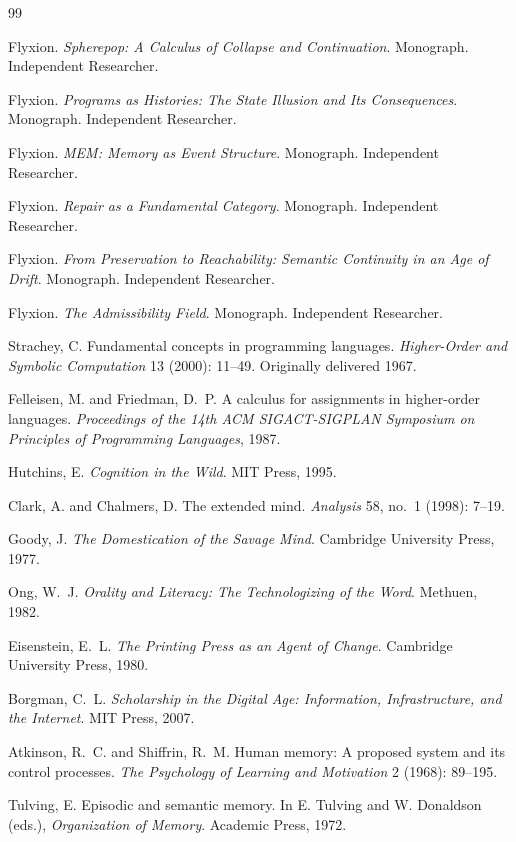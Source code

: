 \documentclass[12pt, a4paper]{article}
\theoremstyle{plain}
\theoremstyle{definition}
\theoremstyle{remark}
\begin{document}
\newpage

\begin{thebibliography}{99}

Flyxion. \emph{Spherepop: A Calculus of Collapse and Continuation}. Monograph.
Independent Researcher.

Flyxion. \emph{Programs as Histories: The State Illusion and Its Consequences}.
Monograph. Independent Researcher.

Flyxion. \emph{MEM: Memory as Event Structure}. Monograph. Independent
Researcher.

Flyxion. \emph{Repair as a Fundamental Category}. Monograph. Independent
Researcher.

Flyxion. \emph{From Preservation to Reachability: Semantic Continuity in an Age
of Drift}. Monograph. Independent Researcher.

Flyxion. \emph{The Admissibility Field}. Monograph. Independent Researcher.

Strachey, C. Fundamental concepts in programming languages. \emph{Higher-Order
and Symbolic Computation} 13 (2000): 11--49. Originally delivered 1967.

Felleisen, M. and Friedman, D.~P. A calculus for assignments in higher-order
languages. \emph{Proceedings of the 14th ACM SIGACT-SIGPLAN Symposium on
Principles of Programming Languages}, 1987.

Hutchins, E. \emph{Cognition in the Wild}. MIT Press, 1995.

Clark, A. and Chalmers, D. The extended mind. \emph{Analysis} 58, no.~1 (1998):
7--19.

Goody, J. \emph{The Domestication of the Savage Mind}. Cambridge University
Press, 1977.

Ong, W.~J. \emph{Orality and Literacy: The Technologizing of the Word}. Methuen,
1982.

Eisenstein, E.~L. \emph{The Printing Press as an Agent of Change}. Cambridge
University Press, 1980.

Borgman, C.~L. \emph{Scholarship in the Digital Age: Information, Infrastructure,
and the Internet}. MIT Press, 2007.

Atkinson, R.~C. and Shiffrin, R.~M. Human memory: A proposed system and its
control processes. \emph{The Psychology of Learning and Motivation} 2 (1968):
89--195.

Tulving, E. Episodic and semantic memory. In E. Tulving and W. Donaldson (eds.),
\emph{Organization of Memory}. Academic Press, 1972.

\end{thebibliography}
\end{document}
